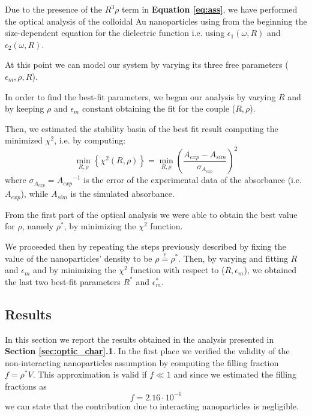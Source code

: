 \documentclass[twocolumn]{article}
\begin{document}
\begin{multicols}{2}

Due to the presence of the $R^3\rho$ term in \textbf{Equation \ref{eq:ass}}, we have performed the optical analysis of the colloidal Au nanoparticles using from the beginning the size-dependent equation for the dielectric function i.e. using $\epsilon_1(\omega,R)$ and $\epsilon_2(\omega,R)$.

At this point we can model our system by varying its three free parameters ($\epsilon_m, \rho, R$). 

In order to find the best-fit parameters, we began our analysis by varying $R$ and by keeping $\rho$ and $\epsilon_m$ constant obtaining the fit for the couple ($R,\rho$). 

Then, we estimated the stability basin of the best fit result computing the minimized $\chi^2$, i.e. by computing:
\begin{equation}
        {\min}_{R,\rho} \left\{\chi^2 (R,\rho) \right\} =\min_{R,\rho} \left(\frac{A_{exp}-A_{sim}}{\sigma_{A_{exp}}}\right)^2 
\end{equation}
where $\sigma_{A_{exp}}={A_{exp}}^{-1}$ is the error of the experimental data of the absorbance (i.e. $A_{exp}$), while $A_{sim}$ is the simulated absorbance.%

From the first part of the optical analysis we were able to obtain the best value for $\rho$, namely $\rho^*$, by minimizing the $\chi^2$ function.

We proceeded then by repeating the steps previously described by fixing the value of the nanoparticles' density to be $\rho\overset{!}{=}\rho^*$. Then, by varying and fitting $R$ and $\epsilon_m$ and by minimizing the $\chi^2$ function with respect to ($R,\epsilon_m$), we obtained the last two best-fit parameters $R^*$ and $\epsilon_m^*$.

\subsection{Results}
\label{sec:risultati}

In this section we report the results obtained in the analysis presented in \textbf{Section \ref{sec:optic_char}.1}.
In the first place we verified the validity of the non-interacting nanoparticles assumption by computing the filling fraction $f=\rho^* V$. This approximation is valid if $f\ll 1 $ and since we estimated the filling fractions as
\[f=2.16\cdot 10^{-6}\]
we can state that the contribution due to interacting nanoparticles is negligible.


\end{multicols}
\end{document}
